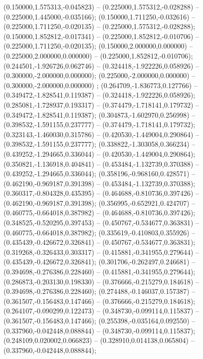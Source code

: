  (0.150000,1.575313,-0.045823) -- (0.225000,1.575312,-0.028288) -- (0.225000,1.445000,-0.035166);
 (0.150000,1.711250,-0.032616) -- (0.225000,1.711250,-0.020135) -- (0.225000,1.575312,-0.028288);
 (0.150000,1.852812,-0.017341) -- (0.225000,1.852812,-0.010706) -- (0.225000,1.711250,-0.020135);
 (0.150000,2.000000,0.000000) -- (0.225000,2.000000,0.000000) -- (0.225000,1.852812,-0.010706);
 (0.244501,-1.926726,0.062746) -- (0.324418,-1.922226,0.058926) -- (0.300000,-2.000000,0.000000);
 (0.225000,-2.000000,0.000000) -- (0.300000,-2.000000,0.000000) ;
 (0.264709,-1.836773,0.127766) -- (0.349472,-1.828541,0.119387) -- (0.324418,-1.922226,0.058926);
 (0.285081,-1.728937,0.193317) -- (0.374479,-1.718141,0.179732) -- (0.349472,-1.828541,0.119387);
 (0.304873,-1.602970,0.256998) -- (0.398532,-1.591155,0.237777) -- (0.374479,-1.718141,0.179732);
 (0.323143,-1.460030,0.315786) -- (0.420530,-1.449004,0.290864) -- (0.398532,-1.591155,0.237777);
 (0.338822,-1.303058,0.366234) -- (0.439252,-1.294665,0.336044) -- (0.420530,-1.449004,0.290864);
 (0.350821,-1.136918,0.404841) -- (0.453484,-1.132739,0.370388) -- (0.439252,-1.294665,0.336044);
 (0.358196,-0.968160,0.428571) -- (0.462190,-0.969187,0.391398) -- (0.453484,-1.132739,0.370388);
 (0.360317,-0.804328,0.435395) -- (0.464688,-0.810736,0.397426) -- (0.462190,-0.969187,0.391398);
 (0.356995,-0.652921,0.424707) -- (0.460775,-0.664018,0.387982) -- (0.464688,-0.810736,0.397426);
 (0.348525,-0.520295,0.397453) -- (0.450767,-0.534677,0.363831) -- (0.460775,-0.664018,0.387982);
 (0.335619,-0.410803,0.355926) -- (0.435439,-0.426672,0.326841) -- (0.450767,-0.534677,0.363831);
 (0.319268,-0.326433,0.303317) -- (0.415881,-0.341955,0.279644) -- (0.435439,-0.426672,0.326841);
 (0.301706,-0.262497,0.246681) -- (0.394698,-0.276386,0.228460) -- (0.415881,-0.341955,0.279644);
 (0.286873,-0.203130,0.198330) -- (0.376666,-0.215279,0.184618) -- (0.394698,-0.276386,0.228460);
 (0.274488,-0.146037,0.157387) -- (0.361507,-0.156483,0.147466) -- (0.376666,-0.215279,0.184618);
 (0.264107,-0.090299,0.122473) -- (0.348730,-0.099114,0.115837) -- (0.361507,-0.156483,0.147466);
 (0.255398,-0.035164,0.092550) -- (0.337960,-0.042448,0.088844) -- (0.348730,-0.099114,0.115837);
 (0.248109,0.020002,0.066823) -- (0.328910,0.014138,0.065804) -- (0.337960,-0.042448,0.088844);
